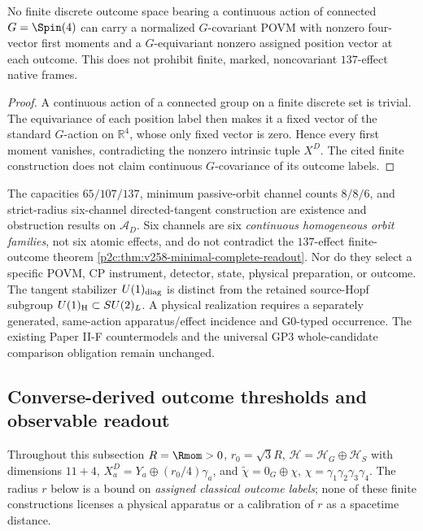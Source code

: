 \documentclass[12pt,a4paper]{article}
\begin{document}
\begin{proposition}
\label{p2c:prop:v270-finite-outcome-covariance-no-go}
No finite discrete outcome space bearing a continuous action of connected
$G=\Spin(4)$ can carry a normalized $G$-covariant POVM with nonzero
four-vector first moments and a $G$-equivariant nonzero assigned position
vector at each outcome.  This does not prohibit finite, marked,
noncovariant $137$-effect native frames.
\end{proposition}
\begin{proof}
A continuous action of a connected group on a finite discrete set is
trivial.  The equivariance of each position label then makes it a fixed
vector of the standard $G$-action on $\mathbb R^4$, whose only fixed
vector is zero.  Hence every first moment vanishes, contradicting the
nonzero intrinsic tuple $X^D$.  The cited finite construction does not
claim continuous $G$-covariance of its outcome labels.
\end{proof}

\begin{remark}
\label{p2c:rem:v270-direction-physical-firewall}
The capacities $65/107/137$, minimum passive-orbit channel counts
$8/8/6$, and strict-radius six-channel directed-tangent construction are
existence and obstruction results on $\mathcal A_D$.  Six channels are six
\emph{continuous homogeneous orbit families}, not six atomic effects,
and do not contradict the $137$-effect finite-outcome theorem
\ref{p2c:thm:v258-minimal-complete-readout}.  Nor do they select a
specific POVM, CP instrument, detector, state, physical preparation, or
outcome.  The tangent stabilizer $U(1)_{\rm diag}$ is distinct from the
retained source-Hopf subgroup $U(1)_{\rm H}\subset SU(2)_L$.
A physical realization requires a separately generated, same-action
apparatus/effect incidence and G0-typed occurrence.  The existing
Paper II-F countermodels and the universal GP3 whole-candidate
comparison obligation remain unchanged.
\end{remark}

\subsection{Converse-derived outcome thresholds and observable readout}
\label{p2c:sec:v266-converse-readout}

Throughout this subsection $R=\Rmom>0$, $r_0=\sqrt3R$,
$\mathcal H=\mathcal H_G\oplus\mathcal H_S$ with dimensions $11+4$,
$X_a^D=Y_a\oplus(r_0/4)\gamma_a$, and
$\widetilde\chi=0_G\oplus\chi$, $\chi=\gamma_1\gamma_2\gamma_3\gamma_4$.
The radius $r$ below is a bound on \emph{assigned classical outcome labels};
none of these finite constructions licenses a physical apparatus or a
calibration of $r$ as a spacetime distance.
\end{document}
